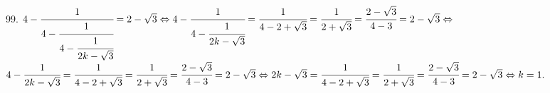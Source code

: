 99. $4-\cfrac{1}{4-\cfrac{1}{4-\cfrac{1}{2k-\sqrt{3}}}}=2-\sqrt{3}\Leftrightarrow
4-\cfrac{1}{4-\cfrac{1}{2k-\sqrt{3}}}=\cfrac{1}{4-2+\sqrt{3}}=\cfrac{1}{2+\sqrt{3}}=\cfrac{2-\sqrt{3}}{4-3}=2-\sqrt{3}\Leftrightarrow$\\$
4-\cfrac{1}{2k-\sqrt{3}}=\cfrac{1}{4-2+\sqrt{3}}=\cfrac{1}{2+\sqrt{3}}=\cfrac{2-\sqrt{3}}{4-3}=2-\sqrt{3}\Leftrightarrow
2k-\sqrt{3}=\cfrac{1}{4-2+\sqrt{3}}=\cfrac{1}{2+\sqrt{3}}=\cfrac{2-\sqrt{3}}{4-3}=2-\sqrt{3}\Leftrightarrow k=1.$\\

